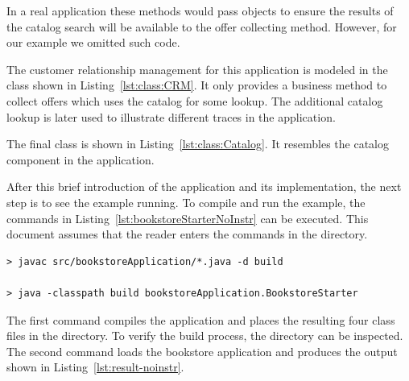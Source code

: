 In a real application these methods would pass objects to ensure the results of the catalog search will be available to the offer collecting method. However, for our example we omitted such code. 



\noindent The customer relationship management for this application is modeled in the  class shown in Listing~\ref{lst:class:CRM}. It only provides a business method to collect offers which uses the catalog for some lookup. The additional catalog lookup is later used to illustrate different traces in the application.



\pagebreak

\noindent The final class is  shown in Listing~\ref{lst:class:Catalog}. It resembles the catalog component in the application.




\noindent After this brief introduction of the application and its implementation, the next step is to see the example running. To compile and run the example, the commands in Listing~\ref{lst:bookstoreStarterNoInstr} can be executed. This document assumes that the reader enters the commands in the  directory.

\setBashListing
% 
\begin{lstlisting}[label=lst:bookstoreStarterNoInstr, caption=Commands to compile and run the Bookstore application]
> javac src/bookstoreApplication/*.java -d build

> java -classpath build bookstoreApplication.BookstoreStarter 
\end{lstlisting}

\noindent The first command compiles the application and places the resulting four class files in the  directory. To verify the build process, the  directory can be inspected. The second command loads the bookstore application and produces the output shown in Listing~\ref{lst:result-noinstr}.


